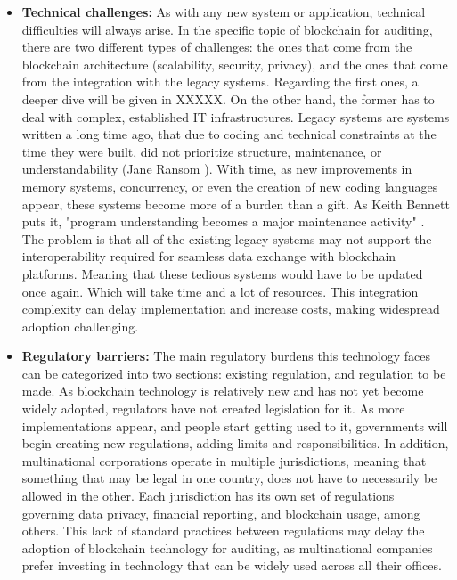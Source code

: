 \begin{itemize}
    \item \textbf{Technical challenges:} As with any new system or application, technical difficulties will always arise. In the specific topic of blockchain for auditing, there are two different types of challenges: the ones that come from the blockchain architecture (scalability, security, privacy), and the ones that come from the integration with the legacy systems. Regarding the first ones, a deeper dive will be given in XXXXX. On the other hand, the former has to deal with complex, established IT infrastructures. Legacy systems are systems written a long time ago, that due to coding and technical constraints at the time they were built, did not prioritize structure, maintenance, or understandability (Jane Ransom \cite{legacySystemsDefinition}). With time, as new improvements in memory systems, concurrency, or even the creation of new coding languages appear, these systems become more of a burden than a gift. As Keith Bennett puts it, "program understanding becomes a major maintenance activity" \cite{legacySystemsProblem}. The problem is that all of the existing legacy systems may not support the interoperability required for seamless data exchange with blockchain platforms. Meaning that these tedious systems would have to be updated once again. Which will take time and a lot of resources. This integration complexity can delay implementation and increase costs, making widespread adoption challenging.
    \item \textbf{Regulatory barriers:} The main regulatory burdens this technology faces can be categorized into two sections: existing regulation, and regulation to be made. As blockchain technology is relatively new and has not yet become widely adopted, regulators have not created legislation for it. As more implementations appear, and people start getting used to it, governments will begin creating new regulations, adding limits and responsibilities. In addition, multinational corporations operate in multiple jurisdictions, meaning that something that may be legal in one country, does not have to necessarily be allowed in the other. Each jurisdiction has its own set of regulations governing data privacy, financial reporting, and blockchain usage, among others. This lack of standard practices between regulations may delay the adoption of blockchain technology for auditing, as multinational companies prefer investing in technology that can be widely used across all their offices. \\

\end{itemize}
